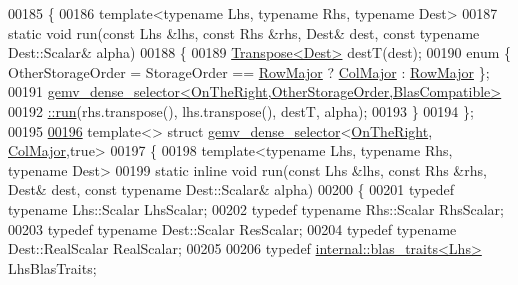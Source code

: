 \begin{DoxyCode}
00185 \{
00186   \textcolor{keyword}{template}<\textcolor{keyword}{typename} Lhs, \textcolor{keyword}{typename} Rhs, \textcolor{keyword}{typename} Dest>
00187   \textcolor{keyword}{static} \textcolor{keywordtype}{void} run(\textcolor{keyword}{const} Lhs &lhs, \textcolor{keyword}{const} Rhs &rhs, Dest& dest, \textcolor{keyword}{const} \textcolor{keyword}{typename} Dest::Scalar& alpha)
00188   \{
00189     \hyperlink{group___core___module_class_eigen_1_1_transpose}{Transpose<Dest>} destT(dest);
00190     \textcolor{keyword}{enum} \{ OtherStorageOrder = StorageOrder == \hyperlink{group__enums_ggaacded1a18ae58b0f554751f6cdf9eb13acfcde9cd8677c5f7caf6bd603666aae3}{RowMajor} ? \hyperlink{group__enums_ggaacded1a18ae58b0f554751f6cdf9eb13a0cbd4bdd0abcfc0224c5fcb5e4f6669a}{ColMajor} : 
      \hyperlink{group__enums_ggaacded1a18ae58b0f554751f6cdf9eb13acfcde9cd8677c5f7caf6bd603666aae3}{RowMajor} \};
00191     \hyperlink{struct_eigen_1_1internal_1_1gemv__dense__selector}{gemv\_dense\_selector<OnTheRight,OtherStorageOrder,BlasCompatible>}
00192 \hyperlink{struct_eigen_1_1internal_1_1gemv__dense__selector}{      ::run}(rhs.transpose(), lhs.transpose(), destT, alpha);
00193   \}
00194 \};
00195 
\hyperlink{struct_eigen_1_1internal_1_1gemv__dense__selector_3_01_on_the_right_00_01_col_major_00_01true_01_4}{00196} \textcolor{keyword}{template}<> \textcolor{keyword}{struct }\hyperlink{struct_eigen_1_1internal_1_1gemv__dense__selector}{gemv\_dense\_selector}<\hyperlink{group__enums_ggac22de43beeac7a78b384f99bed5cee0ba99dc75d8e00b6c3a5bdc31940f47492b}{OnTheRight},
      \hyperlink{group__enums_ggaacded1a18ae58b0f554751f6cdf9eb13a0cbd4bdd0abcfc0224c5fcb5e4f6669a}{ColMajor},true>
00197 \{
00198   \textcolor{keyword}{template}<\textcolor{keyword}{typename} Lhs, \textcolor{keyword}{typename} Rhs, \textcolor{keyword}{typename} Dest>
00199   \textcolor{keyword}{static} \textcolor{keyword}{inline} \textcolor{keywordtype}{void} run(\textcolor{keyword}{const} Lhs &lhs, \textcolor{keyword}{const} Rhs &rhs, Dest& dest, \textcolor{keyword}{const} \textcolor{keyword}{typename} Dest::Scalar& alpha)
00200   \{
00201     \textcolor{keyword}{typedef} \textcolor{keyword}{typename} Lhs::Scalar   LhsScalar;
00202     \textcolor{keyword}{typedef} \textcolor{keyword}{typename} Rhs::Scalar   RhsScalar;
00203     \textcolor{keyword}{typedef} \textcolor{keyword}{typename} Dest::Scalar  ResScalar;
00204     \textcolor{keyword}{typedef} \textcolor{keyword}{typename} Dest::RealScalar  RealScalar;
00205     
00206     \textcolor{keyword}{typedef} \hyperlink{struct_eigen_1_1internal_1_1blas__traits}{internal::blas\_traits<Lhs>} LhsBlasTraits;

\end{DoxyCode}
